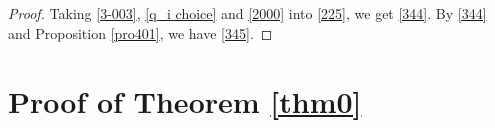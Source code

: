 \documentclass[12pt,reqno]{amsart}
\numberwithin{equation}{section}
\theoremstyle{definition}
\theoremstyle{remark}
\begin{document}
\begin{proof}
Taking \eqref{3-003}, \eqref{q_i choice} and \eqref{2000} into \eqref{225}, we get
\eqref{344}. By \eqref{344} and Proposition \ref{pro401}, we have \eqref{345}.%






\end{proof}
\section{Proof of Theorem \ref{thm0}}
\end{document}
